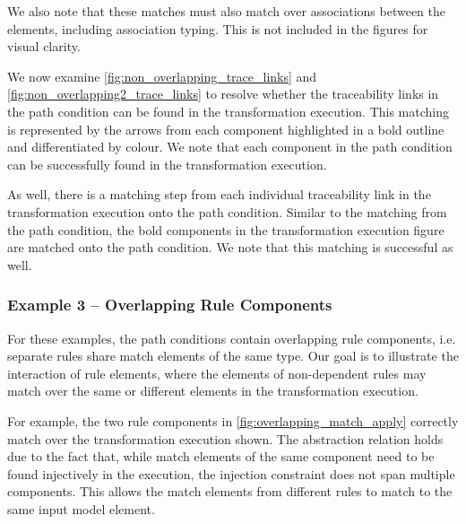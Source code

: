 We also note that these matches must also match over associations between the elements, including association typing. This is not included in the figures for visual clarity.


We now examine \cref{fig:non_overlapping_trace_links} and \cref{fig:non_overlapping2_trace_links} to resolve whether the traceability links in the path condition can be found in the transformation execution. This matching is represented by the arrows from each component highlighted in a bold outline and differentiated by colour. We note that each component in the path condition can be successfully found in the transformation execution.

As well, there is a matching step from each individual traceability link in the transformation execution onto the path condition. Similar to the matching from the path condition, the bold components in the transformation execution figure are matched onto the path condition. We note that this matching is successful as well.


\subsubsection{Example 3 -- Overlapping Rule Components}
\label{subsubsec:abstraction_relation_overlapping}

For these examples, the path conditions contain overlapping rule components, i.e. separate rules share match elements of the same type. Our goal is to illustrate the interaction of rule elements, where the elements of non-dependent rules may match over the same or different elements in the transformation execution.

For example, the two rule components in \cref{fig:overlapping_match_apply} correctly match over the transformation execution shown. The abstraction relation holds due to the fact that, while match elements of the same component need to be found injectively in the execution, the injection constraint does not span multiple components. This allows the match elements from different rules to match to the same input model element.



